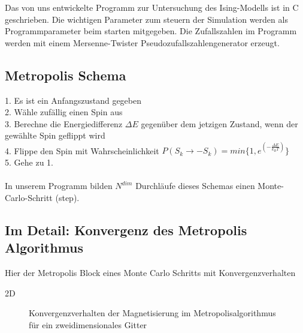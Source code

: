 Das von uns entwickelte Programm zur Untersuchung des Ising-Modells ist in C geschrieben. Die wichtigen Parameter zum steuern der Simulation werden als Programmparameter beim starten mitgegeben. Die Zufallszahlen im Programm werden mit einem Mersenne-Twister Pseudozufallszahlengenerator erzeugt.

\subsection{Metropolis Schema}

1. Es ist ein Anfangszustand gegeben\\
2. Wähle zufällig einen Spin aus\\
3. Berechne die Energiedifferenz $\Delta E$ gegenüber dem jetzigen Zustand, wenn der gewählte Spin geflippt wird\\
4. Flippe den Spin mit Wahrscheinlichkeit $P(S_k \rightarrow -S_k)=min\{ 1, e^{(-\frac{\Delta E}{k_B T})} \}$\\
5. Gehe zu 1.\\\\
In unserem Programm bilden $N^{dim}$ Durchläufe dieses Schemas einen Monte-Carlo-Schritt (step).

\subsection{Im Detail: Konvergenz des Metropolis Algorithmus}

Hier der Metropolis Block eines Monte Carlo Schritts mit Konvergenzverhalten

2D

\begin{figure}[H]
	\centering
	\caption{Konvergenzverhalten der Magnetisierung im Metropolisalgorithmus für ein zweidimensionales Gitter}
	\label{mp2dkonv}
\end{figure}

